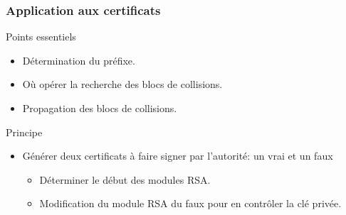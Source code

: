 			
			
			
	\begin{frame}
		\frametitle{Application aux certificats}
		\begin{block}{Points essentiels}
		  \begin{itemize}
		  \item D\'etermination du pr\'efixe.
		  \item O\`u op\'erer la recherche des blocs de collisions.
		  \item Propagation des blocs de collisions.
		  \end{itemize}
		\end{block}
		
		\begin{block}{Principe}
		  \begin{itemize}
		  \item G\'en\'erer deux certificats \`a faire signer par l'autorit\'e: un vrai et un faux
		    \begin{itemize}
		    \item D\'eterminer le d\'ebut des modules RSA.
		    \item Modification du module RSA du faux pour en contr\^oler la cl\'e priv\'ee.
		    \end{itemize}
		  \end{itemize}
		\end{block}
		
	\end{frame}
